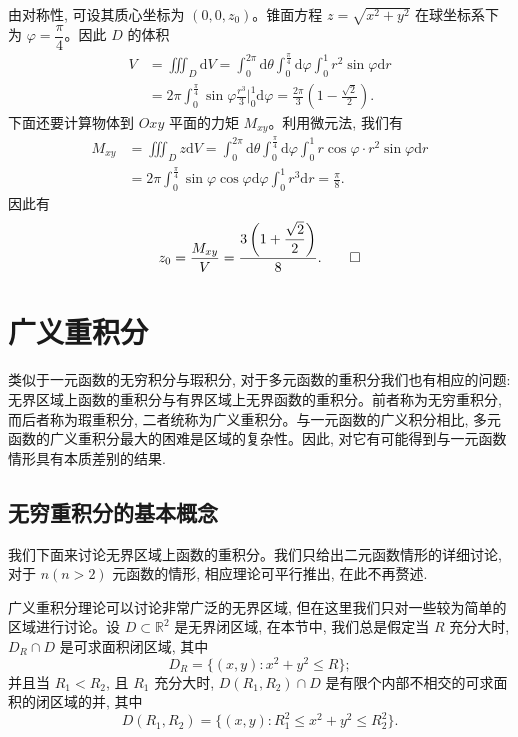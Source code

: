 \begin{solve}
由对称性, 可设其质心坐标为 $(0,0,z_0)$。锥面方程 $z=\sqrt{x^2+y^2}$ 在球坐标系下为 $\varphi=\dfrac\pi4$。因此 $D$ 的体积
\[
\begin{aligned}
  V&=\iiint_D\mathrm dV
  =\int_0^{2\pi}\mathrm d\theta\int_0^{\frac\pi4}\mathrm d\varphi\int_0^1 r^2\sin\varphi\mathrm dr\\
  &=2\pi\int_0^{\frac\pi4}\sin\varphi\frac{r^3}3\Big|_0^1\mathrm d\varphi
  =\frac{2\pi}3\left(1-\frac{\sqrt2}2\right).
\end{aligned}
\]
下面还要计算物体到 $Oxy$ 平面的力矩 $M_{xy}$。利用微元法, 我们有
\[
\begin{aligned}
  M_{xy}&=\iiint_D z\mathrm dV
  =\int_0^{2\pi}\mathrm d\theta\int_0^{\frac\pi4}\mathrm d\varphi\int_0^1
  r\cos\varphi\cdot r^2\sin\varphi\mathrm dr\\
  &=2\pi\int_0^{\frac\pi4}\sin\varphi\cos\varphi\mathrm d\varphi\int_0^1r^3\mathrm dr
  =\frac\pi8.
\end{aligned}
\]
因此有
\[
  z_0=\frac{M_{xy}}V=\frac{3\left(1+\dfrac{\sqrt2}2\right)}8.
\qedhere
\]
\end{solve}


\section{广义重积分}
\label{sec:ma-15-5}

类似于一元函数的无穷积分与瑕积分, 对于多元函数的重积分我们也有相应的问题: 无界区域上函数的重积分与有界区域上无界函数的重积分。前者称为无穷重积分, 而后者称为瑕重积分, 二者统称为广义重积分。与一元函数的广义积分相比, 多元函数的广义重积分最大的困难是区域的复杂性。因此, 对它有可能得到与一元函数情形具有本质差别的结果.

\subsection{无穷重积分的基本概念}
\label{subsec:ma-15-5-1}

我们下面来讨论无界区域上函数的重积分。我们只给出二元函数情形的详细讨论, 对于 $n(n>2)$ 元函数的情形, 相应理论可平行推出, 在此不再赘述.

广义重积分理论可以讨论非常广泛的无界区域, 但在这里我们只对一些较为简单的区域进行讨论。设 $D\subset\mathbb R^2$ 是无界闭区域, 在本节中, 我们总是假定当 $R$ 充分大时, $D_R\cap D$ 是可求面积闭区域, 其中
\[
  D_R=\{(x,y):x^2+y^2\leqslant R\};
\]
并且当 $R_1<R_2$, 且 $R_1$ 充分大时, $D(R_1,R_2)\cap D$ 是有限个内部不相交的可求面积的闭区域的并, 其中
\[
  D(R_1,R_2)=\{(x,y):R_1^2\leqslant x^2+y^2\leqslant R_2^2\}.
\]

